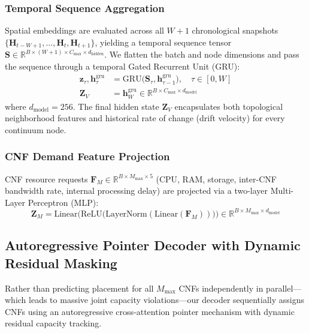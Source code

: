 \documentclass[conference]{IEEEtran}
\begin{document}
\subsubsection{Temporal Sequence Aggregation}
Spatial embeddings are evaluated across all $W+1$ chronological snapshots $\{\mathbf{H}_{t-W+1}, \dots, \mathbf{H}_t, \mathbf{H}_{t+1}\}$, yielding a temporal sequence tensor $\mathbf{S} \in \mathbb{R}^{B \times (W+1) \times C_{\max} \times d_{\text{hidden}}}$. We flatten the batch and node dimensions and pass the sequence through a temporal Gated Recurrent Unit (GRU):
\begin{align}
\mathbf{z}_{\tau}, \mathbf{h}_{\tau}^{\text{gru}} &= \text{GRU}\big(\mathbf{S}_{\tau}, \mathbf{h}_{\tau-1}^{\text{gru}}\big), \quad \tau \in [0, W] \\
\mathbf{Z}_V &= \mathbf{h}_{W}^{\text{gru}} \in \mathbb{R}^{B \times C_{\max} \times d_{\text{model}}}
\end{align}
where $d_{\text{model}} = 256$. The final hidden state $\mathbf{Z}_V$ encapsulates both topological neighborhood features and historical rate of change (drift velocity) for every continuum node.

\subsubsection{CNF Demand Feature Projection}
CNF resource requests $\mathbf{F}_M \in \mathbb{R}^{B \times M_{\max} \times 5}$ (CPU, RAM, storage, inter-CNF bandwidth rate, internal processing delay) are projected via a two-layer Multi-Layer Perceptron (MLP):
\begin{equation}
\mathbf{Z}_M = \text{Linear}\Big(\text{ReLU}\big(\text{LayerNorm}(\text{Linear}(\mathbf{F}_M))\big)\Big) \in \mathbb{R}^{B \times M_{\max} \times d_{\text{model}}}
\end{equation}

\subsection{Autoregressive Pointer Decoder with Dynamic Residual Masking}
Rather than predicting placement for all $M_{\max}$ CNFs independently in parallel—which leads to massive joint capacity violations—our decoder sequentially assigns CNFs using an autoregressive cross-attention pointer mechanism with dynamic residual capacity tracking.
\end{document}
